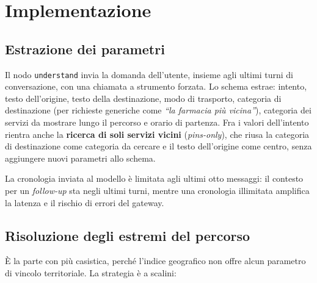 \documentclass[a4paper,oneside]{Tptesi2}
\begin{document}
\chapter{Implementazione}

\section{Estrazione dei parametri}

Il nodo \texttt{understand} invia la domanda dell'utente, insieme agli ultimi turni di
conversazione, con una chiamata a strumento forzata. Lo schema estrae:
intento, testo dell'origine, testo della destinazione, modo di trasporto, categoria di
destinazione (per richieste generiche come \emph{``la farmacia pi\`u vicina''}),
categoria dei servizi da mostrare lungo il percorso e orario di partenza. Fra i valori
dell'intento rientra anche la \textbf{ricerca di soli servizi vicini} (\emph{pins-only}),
che riusa la categoria di destinazione come categoria da cercare e il testo dell'origine
come centro, senza aggiungere nuovi parametri allo schema.

La cronologia inviata al modello \`e limitata agli ultimi otto messaggi: il contesto
per un \emph{follow-up} sta negli ultimi turni, mentre una cronologia illimitata
amplifica la latenza e il rischio di errori del gateway.

\section{Risoluzione degli estremi del percorso}

\`E la parte con pi\`u casistica, perch\'e l'indice geografico non offre alcun
parametro di vincolo territoriale. La strategia \`e a scalini:
\end{document}
